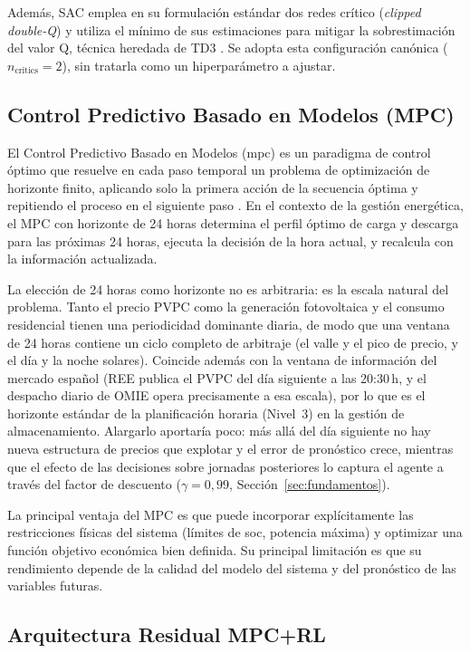 \documentclass[12pt, a4paper, twoside]{report}
\begin{document}
Además, SAC emplea en su formulación estándar dos redes crítico
(\textit{clipped double-Q}) y utiliza el mínimo de sus estimaciones para
mitigar la sobrestimación del valor Q, técnica heredada de TD3
\citep{Fujimoto2018}. Se adopta esta configuración canónica
($n_{\text{critics}}=2$), sin tratarla como un hiperparámetro a ajustar.

\subsection{Control Predictivo Basado en Modelos (MPC)}
\label{sub:mpc_teoria}

El Control Predictivo Basado en Modelos (\acrshort{mpc}) es un paradigma de
control óptimo que resuelve en cada paso
temporal un problema de optimización de horizonte finito, aplicando solo la
primera acción de la secuencia óptima y repitiendo el proceso en el siguiente
paso \citep{Rawlings2017}. En el contexto de la gestión energética, el MPC
con horizonte de 24 horas determina el perfil óptimo de carga y descarga para
las próximas 24 horas, ejecuta la decisión de la hora actual, y recalcula con
la información actualizada.

La elección de 24 horas como horizonte no es arbitraria: es la escala natural
del problema. Tanto el precio PVPC como la generación fotovoltaica y el
consumo residencial tienen una periodicidad dominante diaria, de modo que una
ventana de 24 horas contiene un ciclo completo de arbitraje (el valle y el
pico de precio, y el día y la noche solares). Coincide además con la ventana
de información del mercado español (REE publica el PVPC del día siguiente a
las 20:30\,h, y el despacho diario de OMIE opera precisamente a esa escala),
por lo que es el horizonte estándar de la planificación horaria (Nivel~3) en
la gestión de almacenamiento. Alargarlo aportaría poco: más allá del día
siguiente no hay nueva estructura de precios que explotar y el error de
pronóstico crece, mientras que el efecto de las decisiones sobre jornadas
posteriores lo captura el agente a través del factor de descuento
($\gamma=0{,}99$, Sección~\ref{sec:fundamentos}).

La principal ventaja del MPC es que puede incorporar explícitamente las
restricciones físicas del sistema (límites de \acrshort{soc}, potencia máxima) y optimizar
una función objetivo económica bien definida. Su principal limitación es que
su rendimiento depende de la calidad del modelo del sistema y del pronóstico
de las variables futuras.

\subsection{Arquitectura Residual MPC+RL}
\label{sub:residual_teoria}
\end{document}

